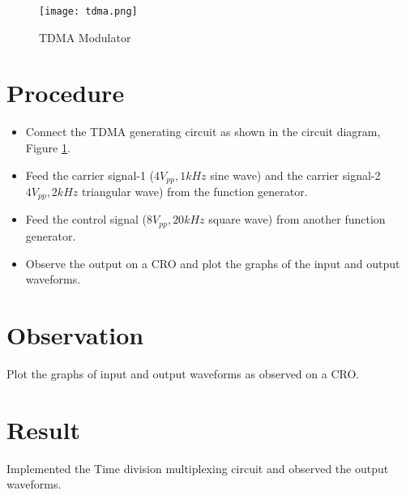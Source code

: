 \begin{figure}[h]
	\texttt{[image: tdma.png]}
	\caption{TDMA Modulator}
	\label{tdma}
\end{figure}

\clearpage
\section*{Procedure}
\begin{itemize}
\item
Connect the TDMA generating circuit as shown in the circuit diagram, Figure \ref{tdma}.
\item
Feed the carrier signal-1 ($4 V_{pp}, 1 kHz$ sine wave) and the carrier signal-2 $4 V_{pp}, 2 kHz$ triangular wave) from the function generator.
\item
Feed the control signal  ($8 V_{pp}, 20 kHz$ square wave) from another function generator.
\item
Observe the output on a CRO and plot the graphs of the input and output waveforms.

\end{itemize}
\section*{Observation}
Plot the graphs of input and output waveforms as observed on a CRO.
\section*{Result}

Implemented the Time division multiplexing circuit and observed the output waveforms.
